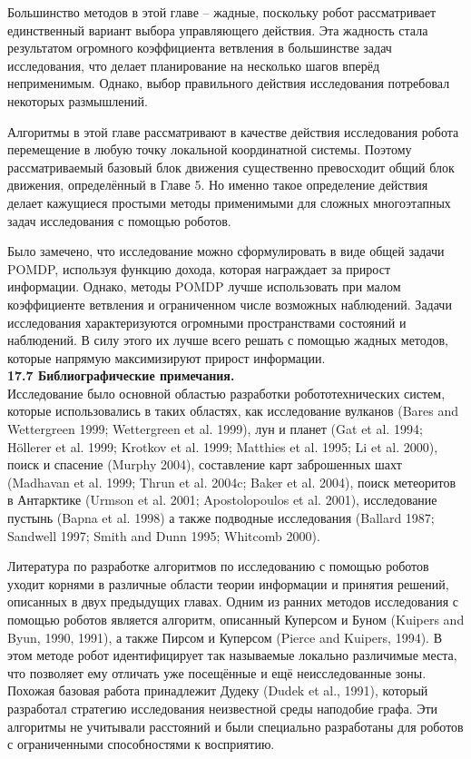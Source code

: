\documentclass[10pt,a4paper]{article}
\begin{document}
Большинство методов в этой главе – жадные, поскольку робот рассматривает единственный вариант выбора управляющего действия. Эта жадность стала результатом огромного коэффициента ветвления в большинстве задач исследования, что делает планирование на несколько шагов вперёд неприменимым. Однако, выбор правильного действия исследования потребовал некоторых размышлений.

Алгоритмы в этой главе рассматривают в качестве действия исследования робота перемещение в любую точку локальной координатной системы. Поэтому рассматриваемый базовый блок движения существенно превосходит общий блок движения, определённый в Главе 5. Но именно такое определение действия делает кажущиеся простыми методы применимыми для сложных многоэтапных задач исследования с помощью роботов.

Было замечено, что исследование можно сформулировать в виде общей задачи POMDP, используя функцию дохода, которая награждает за прирост информации. Однако, методы POMDP лучше использовать при малом коэффициенте ветвления и ограниченном числе возможных наблюдений. Задачи исследования характеризуются огромными пространствами состояний и наблюдений. В силу этого их лучше всего решать с помощью жадных методов, которые напрямую максимизируют прирост информации. \\

\textbf{17.7	Библиографические примечания.}\\

Исследование было основной областью разработки робототехнических систем, которые использовались в таких областях, как исследование вулканов (Bares and Wettergreen 1999; Wettergreen et al. 1999), лун и планет (Gat et al. 1994; Höllerer et al. 1999; Krotkov et al. 1999; Matthies et al. 1995; Li et al. 2000), поиск и спасение (Murphy 2004), составление карт заброшенных шахт (Madhavan et al. 1999; Thrun et al. 2004c; Baker et al. 2004), поиск метеоритов в Антарктике (Urmson et al. 2001; Apostolopoulos et al. 2001), исследование пустынь (Bapna et al. 1998) а также подводные исследования (Ballard 1987; Sandwell 1997; Smith and Dunn 1995; Whitcomb 2000).

Литература по разработке алгоритмов по исследованию с помощью роботов уходит корнями в различные области теории информации и принятия решений, описанных в двух предыдущих главах. Одним из ранних методов исследования с помощью роботов является алгоритм, описанный Куперсом и Буном (Kuipers and Byun, 1990, 1991), а также Пирсом и Куперсом (Pierce and Kuipers, 1994). В этом методе робот идентифицирует так называемые локально различимые места, что позволяет ему отличать уже посещённые и ещё неисследованные зоны. Похожая базовая работа принадлежит Дудеку (Dudek et al., 1991), который разработал стратегию исследования неизвестной среды наподобие графа. Эти алгоритмы не учитывали расстояний и были специально разработаны для роботов с ограниченными способностями к восприятию.
\end{document}
